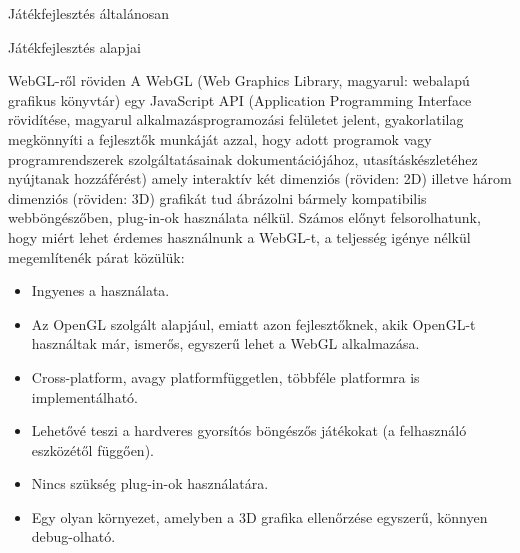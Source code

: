 \begin{MyChapter}{Játékfejlesztés általánosan}
\begin{MySection}{Játékfejlesztés alapjai}
		\begin{MySubSection}{WebGL-ről röviden}
			A WebGL (Web Graphics Library, magyarul: webalapú grafikus könyvtár) egy JavaScript API (Application Programming Interface rövidítése, magyarul alkalmazásprogramozási felületet jelent, gyakorlatilag megkönnyíti a fejlesztők munkáját azzal, hogy adott programok vagy programrendszerek szolgáltatásainak dokumentációjához, utasításkészletéhez nyújtanak hozzáférést) amely interaktív két dimenziós (röviden: 2D) illetve három dimenziós (röviden: 3D) grafikát tud ábrázolni bármely kompatibilis webböngészőben, plug-in-ok használata nélkül.
			Számos előnyt felsorolhatunk, hogy miért lehet érdemes használnunk a WebGL-t, a teljesség igénye nélkül megemlítenék párat közülük:
			\begin{itemize}
				\item Ingyenes a használata.
				\item Az OpenGL szolgált alapjául, emiatt azon fejlesztőknek, akik OpenGL-t használtak már, ismerős, egyszerű lehet a WebGL alkalmazása. 
				\item Cross-platform, avagy platformfüggetlen, többféle platformra is implementálható.
				\item Lehetővé teszi a hardveres gyorsítós böngészős játékokat (a felhasználó eszközétől függően).
				\item Nincs szükség plug-in-ok használatára.
				\item Egy olyan környezet, amelyben a 3D grafika ellenőrzése egyszerű, könnyen debug-olható.
			\end{itemize}
		\end{MySubSection}
	\end{MySection}


\end{MyChapter}
